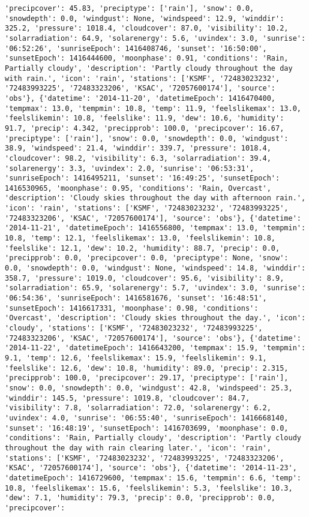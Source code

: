 \documentclass[
  letterpaper,
  DIV=11,
  numbers=noendperiod]{scrartcl}
\begin{document}
\begin{verbatim}
'precipcover': 45.83, 'preciptype': ['rain'], 'snow': 0.0, 'snowdepth': 0.0, 'windgust': None, 'windspeed': 12.9, 'winddir': 325.2, 'pressure': 1018.4, 'cloudcover': 87.0, 'visibility': 10.2, 'solarradiation': 64.9, 'solarenergy': 5.6, 'uvindex': 3.0, 'sunrise': '06:52:26', 'sunriseEpoch': 1416408746, 'sunset': '16:50:00', 'sunsetEpoch': 1416444600, 'moonphase': 0.91, 'conditions': 'Rain, Partially cloudy', 'description': 'Partly cloudy throughout the day with rain.', 'icon': 'rain', 'stations': ['KSMF', '72483023232', '72483993225', '72483323206', 'KSAC', '72057600174'], 'source': 'obs'}, {'datetime': '2014-11-20', 'datetimeEpoch': 1416470400, 'tempmax': 13.0, 'tempmin': 10.8, 'temp': 11.9, 'feelslikemax': 13.0, 'feelslikemin': 10.8, 'feelslike': 11.9, 'dew': 10.6, 'humidity': 91.7, 'precip': 4.342, 'precipprob': 100.0, 'precipcover': 16.67, 'preciptype': ['rain'], 'snow': 0.0, 'snowdepth': 0.0, 'windgust': 38.9, 'windspeed': 21.4, 'winddir': 339.7, 'pressure': 1018.4, 'cloudcover': 98.2, 'visibility': 6.3, 'solarradiation': 39.4, 'solarenergy': 3.3, 'uvindex': 2.0, 'sunrise': '06:53:31', 'sunriseEpoch': 1416495211, 'sunset': '16:49:25', 'sunsetEpoch': 1416530965, 'moonphase': 0.95, 'conditions': 'Rain, Overcast', 'description': 'Cloudy skies throughout the day with afternoon rain.', 'icon': 'rain', 'stations': ['KSMF', '72483023232', '72483993225', '72483323206', 'KSAC', '72057600174'], 'source': 'obs'}, {'datetime': '2014-11-21', 'datetimeEpoch': 1416556800, 'tempmax': 13.0, 'tempmin': 10.8, 'temp': 12.1, 'feelslikemax': 13.0, 'feelslikemin': 10.8, 'feelslike': 12.1, 'dew': 10.2, 'humidity': 88.7, 'precip': 0.0, 'precipprob': 0.0, 'precipcover': 0.0, 'preciptype': None, 'snow': 0.0, 'snowdepth': 0.0, 'windgust': None, 'windspeed': 14.8, 'winddir': 358.7, 'pressure': 1019.0, 'cloudcover': 95.6, 'visibility': 8.9, 'solarradiation': 65.9, 'solarenergy': 5.7, 'uvindex': 3.0, 'sunrise': '06:54:36', 'sunriseEpoch': 1416581676, 'sunset': '16:48:51', 'sunsetEpoch': 1416617331, 'moonphase': 0.98, 'conditions': 'Overcast', 'description': 'Cloudy skies throughout the day.', 'icon': 'cloudy', 'stations': ['KSMF', '72483023232', '72483993225', '72483323206', 'KSAC', '72057600174'], 'source': 'obs'}, {'datetime': '2014-11-22', 'datetimeEpoch': 1416643200, 'tempmax': 15.9, 'tempmin': 9.1, 'temp': 12.6, 'feelslikemax': 15.9, 'feelslikemin': 9.1, 'feelslike': 12.6, 'dew': 10.8, 'humidity': 89.0, 'precip': 2.315, 'precipprob': 100.0, 'precipcover': 29.17, 'preciptype': ['rain'], 'snow': 0.0, 'snowdepth': 0.0, 'windgust': 42.8, 'windspeed': 25.3, 'winddir': 145.5, 'pressure': 1019.8, 'cloudcover': 84.7, 'visibility': 7.8, 'solarradiation': 72.0, 'solarenergy': 6.2, 'uvindex': 4.0, 'sunrise': '06:55:40', 'sunriseEpoch': 1416668140, 'sunset': '16:48:19', 'sunsetEpoch': 1416703699, 'moonphase': 0.0, 'conditions': 'Rain, Partially cloudy', 'description': 'Partly cloudy throughout the day with rain clearing later.', 'icon': 'rain', 'stations': ['KSMF', '72483023232', '72483993225', '72483323206', 'KSAC', '72057600174'], 'source': 'obs'}, {'datetime': '2014-11-23', 'datetimeEpoch': 1416729600, 'tempmax': 15.6, 'tempmin': 6.6, 'temp': 10.8, 'feelslikemax': 15.6, 'feelslikemin': 5.3, 'feelslike': 10.3, 'dew': 7.1, 'humidity': 79.3, 'precip': 0.0, 'precipprob': 0.0, 'precipcover': 
\end{verbatim}
\end{document}
